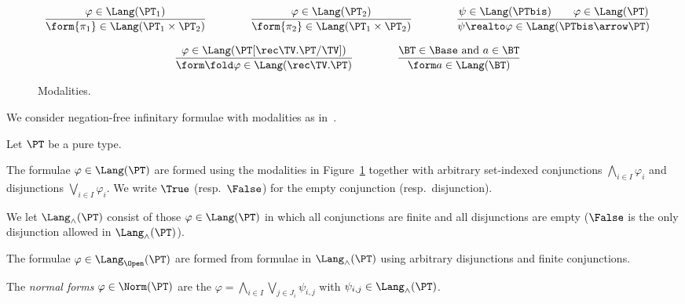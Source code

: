 \begin{figure}[t!]
\[
\begin{array}{c}

\dfrac{\varphi \in \Lang(\PT_1)}
  {\form{\pi_1} \in \Lang(\PT_1 \times \PT_2)}

\qquad\qquad

\dfrac{\varphi \in \Lang(\PT_2)}
  {\form{\pi_2} \in \Lang(\PT_1 \times \PT_2)}

\qquad\qquad

\dfrac{\psi \in \Lang(\PTbis)
  \qquad
  \varphi \in \Lang(\PT)}
  {\psi \realto \varphi \in \Lang(\PTbis \arrow \PT)}

\\\\

\dfrac{\varphi \in \Lang(\PT[\rec \TV.\PT/\TV])}
  {\form\fold \varphi \in \Lang(\rec \TV.\PT)}

\qquad\qquad

\dfrac
  {\text{$\BT \in \Base$ and $a \in \BT$}}
  {\form a \in \Lang(\BT)}

\end{array}
\]
\caption{Modalities.%
\label{fig:modal}}
\end{figure}


\noindent
We consider negation-free infinitary formulae with modalities
as in~\cite{abramsky91apal,bk03ic,jr21esop}.



\begin{definition}[Formulae]
\label{def:form}
Let $\PT$ be a pure type.

The formulae $\varphi \in \Lang(\PT)$
are formed using the modalities in Figure~\ref{fig:modal}
together with arbitrary set-indexed %
conjunctions $\bigwedge_{i \in I} \varphi_i$ and
disjunctions $\bigvee_{i \in I} \varphi_i$.
We write $\True$ (resp.\ $\False$) for the empty conjunction (resp.\ disjunction).

We let $\Lang_\land(\PT)$
consist of those $\varphi \in \Lang(\PT)$
in which all conjunctions are finite and all disjunctions are empty
($\False$ is the only disjunction allowed in $\Lang_\land(\PT)$).

The formulae $\varphi \in \Lang_\Open(\PT)$
are formed from formulae in $\Lang_\land(\PT)$
using arbitrary disjunctions and finite conjunctions.

The \emph{normal forms} $\varphi \in \Norm(\PT)$
are the $\varphi = \bigwedge_{i \in I} \bigvee_{j \in J_i}\psi_{i,j}$
with $\psi_{i,j} \in \Lang_\land(\PT)$.
\end{definition}

